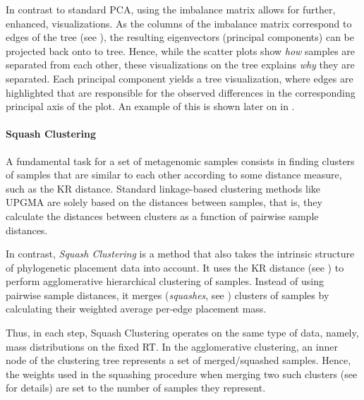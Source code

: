 In contrast to standard PCA, using the imbalance matrix allows for further, enhanced, visualizations.
As the columns of the imbalance matrix correspond to edges of the tree
(see ),
the resulting eigenvectors (principal components) can be projected back onto to tree.
Hence, while the scatter plots show \emph{how} samples are separated from each other,
these visualizations on the tree explains \emph{why} they are separated.
Each principal component yields a tree visualization,
where edges are highlighted that are responsible for the observed differences
in the corresponding principal axis of the plot.
An example of this is shown later on in .

\paragraph{Squash Clustering}
\label{ch:Foundations:sec:PhylogeneticPlacement:sub:ExistingMethods:par:SquashClustering}


A fundamental task for a set of metagenomic samples consists in
finding clusters of samples that are similar to each other according to some distance measure, such as the KR distance.
Standard linkage-based clustering methods like \mbox{UPGMA} %
are solely based on the distances between samples,
that is, they calculate the distances between clusters as a function of pairwise sample distances.

In contrast, \emph{Squash Clustering} \cite{Matsen2011a} is a method that
also takes the intrinsic structure of phylogenetic placement data into account.
It uses the KR distance (see )
to perform agglomerative hierarchical clustering of samples.
Instead of using pairwise sample distances,
it merges (\emph{squashes}, see )
clusters of samples by calculating their weighted average per-edge placement mass.

Thus, in each step, Squash Clustering operates on the same type of data, namely, mass distributions on the fixed \ac{RT}.
In the agglomerative clustering, an inner node of the clustering tree represents a set of merged/squashed samples.
Hence, the weights used in the squashing procedure when merging two such clusters
(see  for details) are set to the number of samples they represent.

